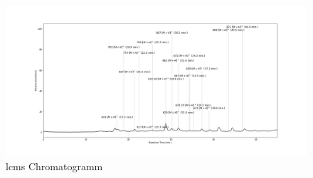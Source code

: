 \begin{figure}[!htbp]
  \centering
  \includegraphics[width=1.1\textwidth]{figures/Kapitel6/Reaktion3h/Kuerbis_Analyse_Reaktion3h_Ganzes_Spektrum.png}
  \caption[LC-MS Chromatogramm nach 3h Reaktionsdauer, Quelle: Author]{\gls{lcms} Chromatogramm}
  \label{fig:LCMSCChromatogrammRP}
\end{figure}

